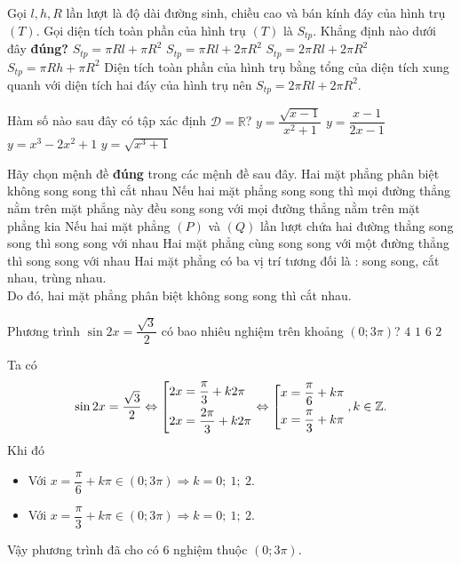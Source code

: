 \begin{ex}%
	Gọi $l,h,R$ lần lượt là độ dài đường sinh, chiều cao và bán kính đáy của hình trụ $(T)$. Gọi diện tích toàn phần của hình trụ $(T)$ là $S_{tp}$. Khẳng định nào dưới đây \textbf{đúng?} 
	\choice
	{$S_{tp}=\pi Rl+\pi R^2$}
	{$S_{tp}=\pi Rl+2\pi R^2$}
	{\True $S_{tp}=2\pi Rl+2\pi R^2$}
	{$S_{tp}=\pi Rh+\pi R^2$}
	\loigiai
	{
		Diện tích toàn phần của hình trụ bằng tổng của diện tích xung quanh với diện tích hai đáy của hình trụ nên $S_{tp}=2\pi Rl+2\pi R^2$.
	}
\end{ex}

\begin{ex}%
	Hàm số nào sau đây có tập xác định $\mathscr{D}=\mathbb{R}$? 
	\choice
	{$y=\dfrac{\sqrt{x-1}}{x^2+1}$}
	{$y=\dfrac{x-1}{2x-1}$}
	{\True $y=x^3-2x^2+1$}
	{$y=\sqrt{x^3+1}$}
\end{ex}

\begin{ex}%
	Hãy chọn mệnh đề \textbf{đúng} trong các mệnh đề sau đây.
	\choice
	{\True Hai mặt phẳng phân biệt không song song thì cắt nhau}
	{Nếu hai mặt phẳng song song thì mọi đường thẳng nằm trên mặt phẳng này đều song song với mọi đường thẳng nằm trên mặt phẳng kia}
	{Nếu hai mặt phẳng $(P)$ và $(Q)$ lần lượt chứa hai đường thẳng song song thì song song với nhau}
	{Hai mặt phẳng cùng song song với một đường thẳng thì song song với nhau}
	\loigiai
	{
		Hai mặt phẳng có ba vị trí tương đối là : song song, cắt nhau, trùng nhau.\\
		Do đó, hai mặt phẳng phân biệt không song song thì cắt nhau.
	}
\end{ex}

\begin{ex}%
	Phương trình $\sin 2x=\dfrac{\sqrt{3}}{2}$ có bao nhiêu nghiệm trên khoảng $(0;3\pi)$?
	\choice
	{$4$}
	{$1$}
	{\True $6$}
	{$2$}
	\loigiai
	{Ta có
		\[\sin 2x=\dfrac{\sqrt{3}}{2} \Leftrightarrow \left[\begin{aligned}&2x=\dfrac{\pi}{3}+k2\pi\\&2x=\dfrac{2\pi}{3}+k2\pi\end{aligned}\right. \Leftrightarrow \left[\begin{aligned}&x=\dfrac{\pi}{6}+k\pi\\&x=\dfrac{\pi}{3}+k\pi\end{aligned}\right., k \in \mathbb{Z}.\]
		Khi đó
		\begin{itemize}
			\item Với $x=\dfrac{\pi}{6}+k\pi \in (0;3\pi) \Rightarrow k=0;~1;~2$.
			\item Với $x=\dfrac{\pi}{3}+k\pi \in (0;3\pi) \Rightarrow k=0;~1;~2$.
		\end{itemize}
		Vậy phương trình đã cho có $6$ nghiệm thuộc $(0;3\pi)$.
	}
\end{ex}

